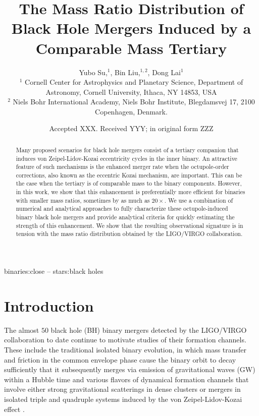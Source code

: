 \documentclass[
        fleqn,
        usenatbib,
    ]{mnras}
\title[Mass Ratio Distribution]{The Mass Ratio Distribution of
Black Hole Mergers Induced by a Comparable Mass Tertiary}
\author[Y. Su et\ al.]{
Yubo Su,$^1$,
Bin Liu,$^{1,2}$,
Dong Lai$^1$
\\
$^1$ Cornell Center for Astrophysics and Planetary Science, Department of
Astronomy, Cornell University, Ithaca, NY 14853, USA\\
$^2$ Niels Bohr International Academy, Niels Bohr Institute, Blegdamsvej 17,
2100 Copenhagen, Denmark.
}
\date{Accepted XXX\@. Received YYY\@; in original form ZZZ}
\begin{document}
\label{firstpage}
\pagerange{\pageref{firstpage}--\pageref{lastpage}}
\maketitle

\begin{abstract}
    Many proposed scenarios for black hole mergers consist of a tertiary
    companion that induces von Zeipel-Lidov-Kozai eccentricity cycles in the
    inner binary. An attractive feature of such mechanisms is the enhanced
    merger rate when the octupole-order corrections, also known as the eccentric
    Kozai mechanism, are important. This can be the case when the tertiary is of
    comparable mass to the binary components. However, in this work, we show
    that this enhancement is preferentially more efficient for binaries with
    smaller mass ratios, sometimes by as much as $20\times$. We use a
    combination of numerical and analytical approaches to fully
    characterize these octupole-induced binary black hole mergers and provide
    analytical criteria for quickly estimating the strength of this enhancement.
    We show that the resulting observational signature is in tension with the
    mass ratio distribution obtained by the LIGO/VIRGO collaboration.
\end{abstract}

\begin{keywords}
binaries:close -- stars:black holes %
\end{keywords}

\section{Introduction}\label{s:intro}

The almost $50$ black hole (BH) binary mergers detected by the LIGO/VIRGO
collaboration to date \citep{LIGOO3a} continue to motivate studies of their
formation channels. These include the traditional isolated binary evolution, in
which mass transfer and friction in the common envelope phase cause the binary
orbit to decay sufficiently that it subsequently merges via emission of
gravitational waves (GW) within a Hubble time \citep[e.g.][]{lipunov1997black,
lipunov2017first, podsiadlowski2003formation, belczynski2010effect,
belczynski2016first, dominik2012double, dominik2013double, dominik2015double}
and various flavors of dynamical formation channels that involve either strong
gravitational scatterings in dense clusters \citep[e.g.][]{zwart1999black,
o2006binary, miller2009mergers, banerjee2010stellar, downing2010compact,
ziosi2014dynamics, rodriguez2015binary, samsing2017assembly, samsing2018black,
rodriguez2018post, gondan2018eccentric} or mergers in isolated triple and
quadruple systems induced by the von Zeipel-Lidov-Kozai effect
\citep[e.g.][]{blaes2002kozai, miller2002four, wen2003eccentricity,
antonini2012secular, antonini2017binary, silsbee2017lidov, bin1, LL18,
randall2018induced, hoang2018black, fragione2019, fragione2019loeb, LL19,
bin_misc5, bin_misc1, bin_misc2}.
\end{document}
